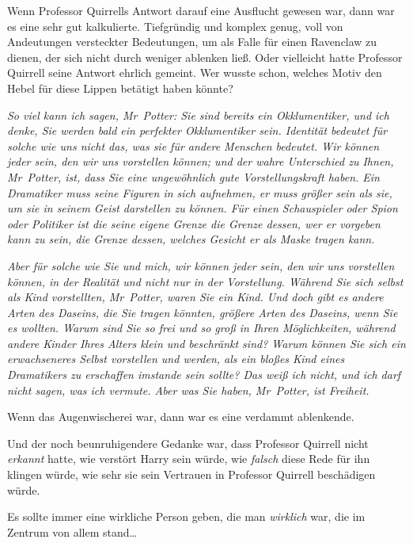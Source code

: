 {Wenn Professor Quirrells Antwort darauf eine Ausflucht gewesen war, dann war es eine sehr gut kalkulierte. Tiefgründig und komplex genug, voll von Andeutungen versteckter Bedeutungen, um als Falle für einen Ravenclaw zu dienen, der sich nicht durch weniger ablenken ließ. Oder vielleicht hatte Professor Quirrell seine Antwort ehrlich gemeint. Wer wusste schon, welches Motiv den Hebel für diese Lippen betätigt haben könnte?

\emph{\emph{So viel kann ich sagen, Mr~Potter: Sie sind bereits ein Okklumentiker, und ich denke, Sie werden bald ein perfekter Okklumentiker} \emph{sein. Identität bedeutet für solche wie uns nicht das, was sie für andere Menschen bedeutet.} \emph{Wir können} \emph{jeder sein, den wir uns vorstellen können; und der wahre Unterschied zu Ihnen, Mr~Potter, ist, dass Sie eine ungewöhnlich gute Vorstellungskraft haben. Ein Dramatiker muss seine Figuren in sich aufnehmen, er muss größer sein als sie, um sie in seinem Geist darstellen zu können. Für einen Schauspieler oder Spion oder Politiker ist die seine eigene Grenze die Grenze dessen, wer er vorgeben kann zu sein, die Grenze dessen, welches Gesicht er als Maske tragen} \emph{kann.}}

\emph{\emph{Aber für solche wie Sie und} \emph{mich,} \emph{wir können jeder sein, den wir uns vorstellen können, in der Realität und nicht} \emph{nur in der Vorstellung. Während Sie sich} \emph{selbst als} \emph{Kind vorstellten, Mr~Potter,} waren \emph{Sie ein Kind. Und doch gibt es andere} \emph{Arten des Daseins, die Sie} \emph{tragen} \emph{könnten, größere} \emph{Arten des Daseins, wenn Sie es wollten. Warum} \emph{sind Sie} \emph{so frei und so groß in} \emph{Ihren Möglichkeiten, während andere Kinder} \emph{Ihres} \emph{Alters klein und beschränkt sind? Warum können Sie sich} \emph{ein erwachseneres Selbst vorstellen und} werden\emph{, als ein bloßes Kind eines Dramatikers zu} \emph{erschaffen} \emph{imstande sein sollte? Das weiß ich nicht, und ich darf nicht sagen, was ich vermute. Aber was Sie haben, Mr~Potter, ist Freiheit.}}

Wenn das Augenwischerei war, dann war es eine verdammt ablenkende.

Und der noch beunruhigendere Gedanke war, dass Professor Quirrell nicht \emph{erkannt} hatte, wie verstört Harry sein würde, wie \emph{falsch} diese Rede für ihn klingen würde, wie sehr sie sein Vertrauen in Professor Quirrell beschädigen würde.

Es sollte immer eine wirkliche Person geben, die man \emph{wirklich} war, die im Zentrum von allem stand…

}
